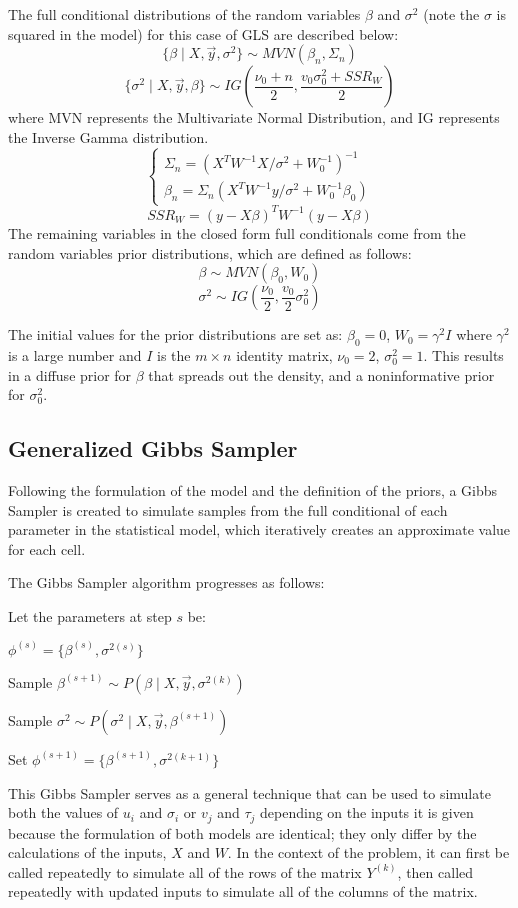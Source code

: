 \documentclass[12pt,twoside]{dukestatscithesis}
\theoremstyle{definition}
\theoremstyle{definition}
\theoremstyle{definition}
\theoremstyle{remark}
\begin{document}
The full conditional distributions of the random variables \(\beta\) and
\(\sigma^2\) (note the \(\sigma\) is squared in the model) for this case
of GLS are described below:
\[\{\beta \mid X, \vec{y}, \sigma^2\} \sim MVN (\beta_n, \Sigma_n)\]
\[\{\sigma^2 \mid X, \vec{y}, \beta\} \sim IG (\frac{\nu_0 + n}{2}, \frac{v_0\sigma^2_0 + SSR_W}{2})\]
where MVN represents the Multivariate Normal Distribution, and IG
represents the Inverse Gamma distribution. \[ \begin{cases}
      \Sigma_n = (X^TW^{-1}X/\sigma^2+W_0^{-1})^{-1}\\
      \beta_n = \Sigma_n(X^TW^{-1}y/\sigma^2 + W_0^{-1} \beta_0)
    \end{cases}\] \[SSR_W = (y - X\beta)^TW^{-1}(y-X\beta)\]
The remaining variables in the closed form full conditionals come from
the random variables prior distributions, which are defined as follows:
\[\beta \sim MVN (\beta_0, W_0)\]
\[\sigma^2 \sim IG (\frac{\nu_0}{2}, \frac{v_0}{2}\sigma_0^2)\]

The initial values for the prior distributions are set as:
\(\beta_0 = 0\), \(W_0 = \gamma^2I\) where \(\gamma^2\) is a large
number and \(I\) is the \(m \times n\) identity matrix, \(\nu_0 = 2\),
\(\sigma_0^2 = 1\). This results in a diffuse prior for \(\beta\) that
spreads out the density, and a noninformative prior for \(\sigma^2_0\).

\subsection{Generalized Gibbs Sampler}\label{generalized-gibbs-sampler}

Following the formulation of the model and the definition of the priors,
a Gibbs Sampler is created to simulate samples from the full conditional
of each parameter in the statistical model, which iteratively creates an
approximate value for each cell.

The Gibbs Sampler algorithm progresses as follows:

Let the parameters at step \(s\) be:

\(\phi^{(s)} = \{\beta^{(s)}, \sigma^{2(s)}\}\)

Sample \(\beta^{(s+1)} \sim P(\beta \mid X, \vec{y}, \sigma^{2(k)})\)

Sample \(\sigma^2 \sim P(\sigma^2 \mid X, \vec{y}, \beta^{(s+1)})\)

Set \(\phi^{(s+1)} = \{\beta^{(s+1)}, \sigma^{2(k+1)}\}\)

This Gibbs Sampler serves as a general technique that can be used to
simulate both the values of \(u_i\) and \(\sigma_i\) or \(v_j\) and
\(\tau_j\) depending on the inputs it is given because the formulation
of both models are identical; they only differ by the calculations of
the inputs, \(X\) and \(W\). In the context of the problem, it can first
be called repeatedly to simulate all of the rows of the matrix
\(Y^{(k)}\), then called repeatedly with updated inputs to simulate all
of the columns of the matrix.
\end{document}

